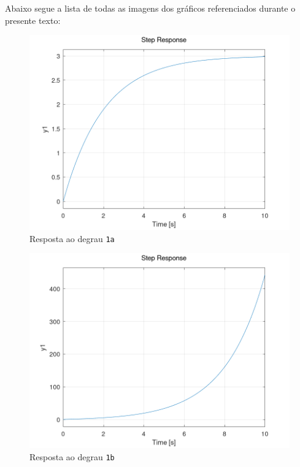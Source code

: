 \documentclass[a4paper,12pt]{article}
\begin{document}
    \newpage
    Abaixo segue a lista de todas as imagens dos gráficos referenciados durante o presente texto:
    \begin{figure}[h]
        \centering
        \includegraphics[scale=0.4]{../fig/fig1a.png}
        \caption{Resposta ao degrau \texttt{1a}}
        \label{fig1a}
    \end{figure}
    \begin{figure}[h]
        \centering
        \includegraphics[scale=0.4]{../fig/fig1b.png}
        \caption{Resposta ao degrau \texttt{1b}}
        \label{fig1b}
    \end{figure}
\end{document}
